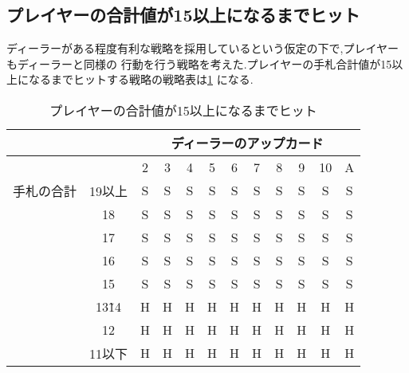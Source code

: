 \subsection{プレイヤーの合計値が15以上になるまでヒット}
ディーラーがある程度有利な戦略を採用しているという仮定の下で,プレイヤーもディーラーと同様の
行動を行う戦略を考えた.プレイヤーの手札合計値が15以上になるまでヒットする戦略の戦略表は\ref{hitleq15}
になる.
\begin{table}[htbp]
  \centering
  \caption{プレイヤーの合計値が15以上になるまでヒット\label{hitleq15}}
  \begin{tabular}{|c|c|c|c|c|c|c|c|c|c|c|c|}
    \hline
    \multicolumn{2}{|c|}{} & \multicolumn{10}{|c|}{ディーラーのアップカード} \\ \hline
    \multicolumn{2}{|c|}{} & 2 & 3 & 4 & 5 & 6 & 7 & 8 & 9 & 10 & A \\ \hline
    手札の合計 & 19以上 & S & S & S & S & S & S & S & S & S & S \\ \cline{3-12}
              & 18 & S & S & S & S & S & S & S & S & S & S \\ \cline{3-12}
              & 17 & S & S & S & S & S & S & S & S & S & S \\ \cline{3-12}
              & 16 & S & S & S & S & S & S & S & S & S & S \\ \cline{3-12}
              & 15 & S & S & S & S & S & S & S & S & S & S \\ \cline{3-12}
              & 13\~ 14 & H & H & H & H & H & H & H & H & H & H \\ \cline{3-12}
              & 12 & H & H & H & H & H & H & H & H & H & H \\ \cline{3-12}
              & 11以下 & H & H & H & H & H & H & H & H & H & H \\ \hline
  \end{tabular}
\end{table}

